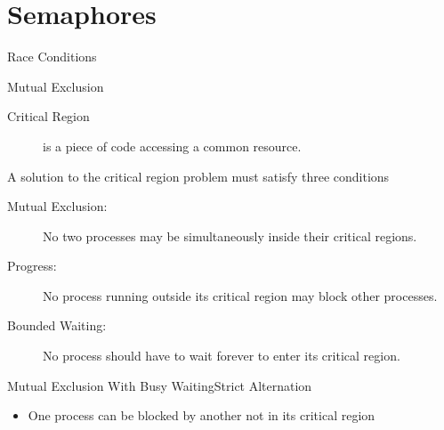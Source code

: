 \section{Semaphores}
\label{sec:semaphores}

\begin{frame}{Race Conditions}
  \begin{center}
  \end{center}
\end{frame}

\begin{frame}{Mutual Exclusion}
  \begin{description}
  \item[Critical Region] is a piece of code accessing a common resource.
  \end{description}
  \begin{center}
  \end{center}
\end{frame}

\begin{frame}
  \begin{block}{A solution to the critical region problem must satisfy three conditions}
    \begin{description}
    \item[Mutual Exclusion:] No two processes may be simultaneously inside their critical
      regions.
    \item[Progress:] No process running outside its critical region may block other
      processes.
    \item[Bounded Waiting:] No process should have to wait forever to enter its critical
      region.
    \end{description}
  \end{block}
\end{frame}

\begin{frame}{Mutual Exclusion With Busy Waiting}{Strict Alternation}
  \begin{center}
  \end{center}
  \begin{itemize}
  \item[\Bad] One process can be blocked by another not in its critical region
  \end{itemize}
\end{frame}

